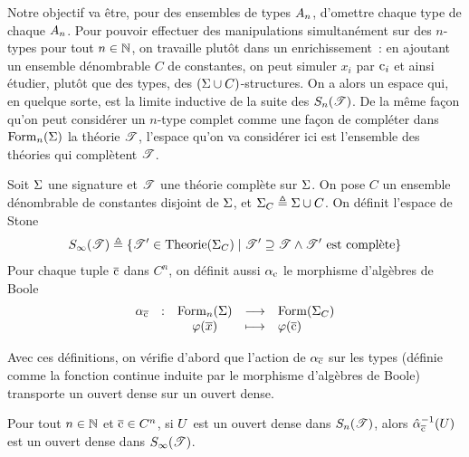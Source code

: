 Notre objectif va être, pour des ensembles de types $A_n$, d'omettre
chaque type de chaque $A_n$. Pour pouvoir effectuer des manipulations
simultanément sur des $n$-types pour tout $n\in\mathbb N$, on travaille plutôt dans
un enrichissement~: en ajoutant un ensemble dénombrable $C$ de constantes,
on peut simuler $x_i$ par $\mathrm{c}_i$ et ainsi étudier, plutôt que des types,
des $(\Sigma\cup C)$-structures. On a alors un espace qui, en quelque sorte, est
la limite inductive de la suite des $S_{n}(\mathscr T)$. De la même façon qu'on
peut considérer un $n$-type complet comme une façon de \og compléter dans
$\operatorname{Form}_n(\Sigma)$ la théorie $\mathscr T$\fg, l'espace qu'on va considérer ici est
l'ensemble des théories qui complètent $\mathscr T$.

\begin{definition}
  Soit $\Sigma$ une signature et $\mathscr T$ une théorie complète sur $\Sigma$. On
  pose $C$ un ensemble dénombrable de constantes disjoint de $\Sigma$, et
  $\Sigma_{C}\triangleq \Sigma\cup C$. On définit l'espace de Stone
  \[S_{\infty}(\mathscr T) \triangleq
  \left\{ \mathscr T'\in\operatorname{Theorie}(\Sigma_{C}) \;\middle\vert\; \mathscr T'\supseteq\mathscr T\land\mathscr T'\text{ est complète} \right\}\]
  Pour chaque tuple $\overline{\mathrm{c}}$ dans $C^n$, on définit aussi
  $\alpha_{\mathrm{c}}$ le morphisme d'algèbres de Boole
  \[\makeFun{\varRen_{\vec{\Cc}}}{\Formula_n(\Sign)}{\Formula(\SignP{C})}
            {\varFF(\vec x)}{\varFF(\vec{\Cc})}\]
\end{definition}

Avec ces définitions, on vérifie d'abord que l'action de $\alpha_{\overline{\mathrm{c}}}$ sur
les types (définie comme la fonction continue induite par le morphisme
d'algèbres de Boole) transporte un ouvert dense sur un ouvert dense.

\begin{proposition}\label{prop.pullback.CplI}
  Pour tout $n \in \mathbb N$ et $\overline{\mathrm{c}}\in C^n$, si $U$ est un ouvert dense
  dans $S_{n}(\mathscr T)$, alors $\hat{\alpha}_{\overline{\mathrm{c}}}^{-1}(U)$ est un
  ouvert dense dans $S_{\infty}(\mathscr T)$.
\end{proposition}


